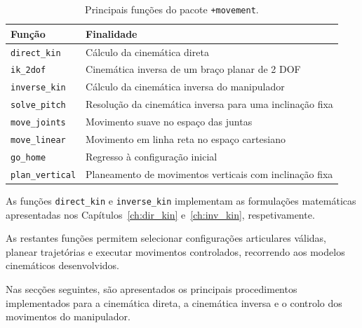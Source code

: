 \begin{table}[H]
    \centering
    \caption{Principais funções do pacote \texttt{+movement}.}
    \label{tab:funcoes}
    \begin{tabular}{ll}
        \hline
        Função & Finalidade \\
        \hline
        \texttt{direct\_kin}
        & Cálculo da cinemática direta \\

        \texttt{ik\_2dof}
        & Cinemática inversa de um braço planar de 2 DOF \\

        \texttt{inverse\_kin}
        & Cálculo da cinemática inversa do manipulador \\

        \texttt{solve\_pitch}
        & Resolução da cinemática inversa para uma inclinação fixa \\

        \texttt{move\_joints}
        & Movimento suave no espaço das juntas \\

        \texttt{move\_linear}
        & Movimento em linha reta no espaço cartesiano \\

        \texttt{go\_home}
        & Regresso à configuração inicial \\

        \texttt{plan\_vertical}
        & Planeamento de movimentos verticais com inclinação fixa \\
        \hline
    \end{tabular}
\end{table}

As funções \texttt{direct\_kin} e \texttt{inverse\_kin} implementam as formulações matemáticas apresentadas nos Capítulos~\ref{ch:dir_kin} e~\ref{ch:inv_kin}, respetivamente.

As restantes funções permitem selecionar configurações articulares válidas, planear trajetórias e executar movimentos controlados, recorrendo aos modelos cinemáticos desenvolvidos.

Nas secções seguintes, são apresentados os principais procedimentos implementados para a cinemática direta, a cinemática inversa e o controlo dos movimentos do manipulador.





